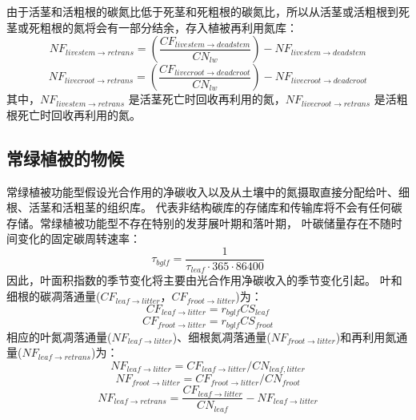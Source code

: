 \begin{enumerate}
由于活茎和活粗根的碳氮比低于死茎和死粗根的碳氮比，所以从活茎或活粗根到死茎或死粗根的氮将会有一部分结余，存入植被再利用氮库：
\begin{equation}
NF_{{livestem\rightarrow retrans}}=\left(\frac{CF_{{livestem\rightarrow deadstem}}}{CN_{lw}}\right)-NF_{{livestem\rightarrow deadstem}}
\end{equation}
\begin{equation}
NF_{{livecroot\rightarrow retrans}}=\left(\frac{CF_{{livecroot\rightarrow deadcroot}}}{CN_{lw}}\right)-NF_{{livecroot\rightarrow deadcroot}}
\end{equation}
其中，$NF_{livestem\rightarrow retrans}$ 是活茎死亡时回收再利用的氮，$NF_{livecroot\rightarrow retrans}$ 是活粗根死亡时回收再利用的氮。

\end{enumerate}


\subsection{常绿植被的物候}\label{常绿植被的物候}
常绿植被功能型假设光合作用的净碳收入以及从土壤中的氮摄取直接分配给叶、细根、活茎和活粗茎的组织库。
代表非结构碳库的存储库和传输库将不会有任何碳存储。常绿植被功能型不存在特别的发芽展叶期和落叶期，
叶碳储量存在不随时间变化的固定碳周转速率：
\begin{equation}
\tau_{bglf}=\frac{1}{\tau_{leaf} \cdot 365 \cdot 86400}
\end{equation}
因此，叶面积指数的季节变化将主要由光合作用净碳收入的季节变化引起。
叶和细根的碳凋落通量($CF_{leaf\rightarrow litter}$，$CF_{froot\rightarrow litter}$)为：
\begin{equation}
CF_{leaf\rightarrow litter}=r_{bglf} CS_{leaf}
\end{equation}
\begin{equation}
CF_{froot\rightarrow litter}=r_{bglf} CS_{froot}
\end{equation}
相应的叶氮凋落通量($NF_{leaf\rightarrow litter}$)、细根氮凋落通量($NF_{froot\rightarrow litter}$)和再利用氮通量($NF_{leaf\rightarrow retrans}$)为：
\begin{equation}
N F_{leaf\rightarrow litter}=CF_{leaf\rightarrow litter} / CN_{leaf,{litter}}
\end{equation}
\begin{equation}
N F_{froot\rightarrow litter}=CF_{froot\rightarrow litter} / CN_{froot}
\end{equation}
\begin{equation}
N F_{leaf\rightarrow retrans}=\frac{CF_{leaf\rightarrow litter }}{CN_{leaf}}-N F_{leaf\rightarrow litter}
\end{equation}


